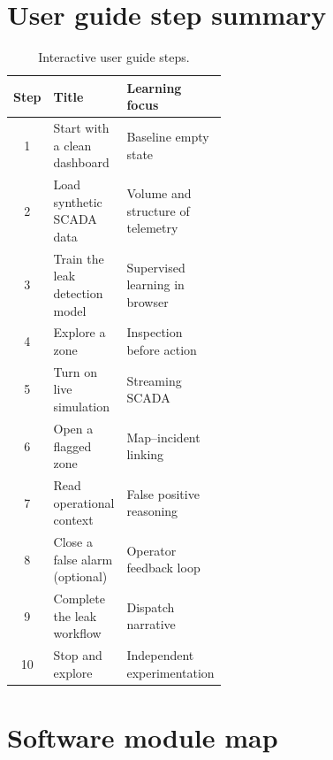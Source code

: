 \documentclass[12pt,a4paper]{article}
\begin{document}
\appendix
\section{User guide step summary}
\label{app:guide}

\begin{table}[htbp]
\centering
\caption{Interactive user guide steps.}
\begin{tabular}{@{}clp{0.48\linewidth}@{}}
\toprule
\textbf{Step} & \textbf{Title} & \textbf{Learning focus} \\
\midrule
1 & Start with a clean dashboard & Baseline empty state \\
2 & Load synthetic SCADA data & Volume and structure of telemetry \\
3 & Train the leak detection model & Supervised learning in browser \\
4 & Explore a zone & Inspection before action \\
5 & Turn on live simulation & Streaming SCADA \\
6 & Open a flagged zone & Map--incident linking \\
7 & Read operational context & False positive reasoning \\
8 & Close a false alarm (optional) & Operator feedback loop \\
9 & Complete the leak workflow & Dispatch narrative \\
10 & Stop and explore & Independent experimentation \\
\bottomrule
\end{tabular}
\end{table}

\section{Software module map}
\label{app:modules}
\end{document}
